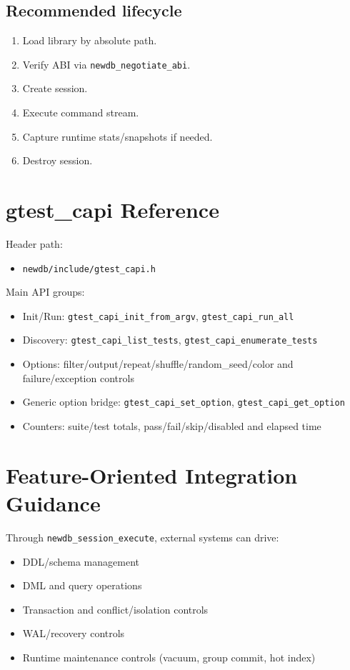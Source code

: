 \documentclass[11pt,a4paper]{article}
\begin{document}
\subsection{Recommended lifecycle}
\begin{enumerate}
  \item Load library by absolute path.
  \item Verify ABI via \texttt{newdb\_negotiate\_abi}.
  \item Create session.
  \item Execute command stream.
  \item Capture runtime stats/snapshots if needed.
  \item Destroy session.
\end{enumerate}

\section{gtest\_capi Reference}
Header path:
\begin{itemize}
  \item \texttt{newdb/include/gtest\_capi.h}
\end{itemize}

Main API groups:
\begin{itemize}
  \item Init/Run:
  \texttt{gtest\_capi\_init\_from\_argv},
  \texttt{gtest\_capi\_run\_all}
  \item Discovery:
  \texttt{gtest\_capi\_list\_tests},
  \texttt{gtest\_capi\_enumerate\_tests}
  \item Options:
  filter/output/repeat/shuffle/random\_seed/color and failure/exception controls
  \item Generic option bridge:
  \texttt{gtest\_capi\_set\_option},
  \texttt{gtest\_capi\_get\_option}
  \item Counters:
  suite/test totals, pass/fail/skip/disabled and elapsed time
\end{itemize}

\section{Feature-Oriented Integration Guidance}
Through \texttt{newdb\_session\_execute}, external systems can drive:
\begin{itemize}
  \item DDL/schema management
  \item DML and query operations
  \item Transaction and conflict/isolation controls
  \item WAL/recovery controls
  \item Runtime maintenance controls (vacuum, group commit, hot index)
\end{itemize}
\end{document}
